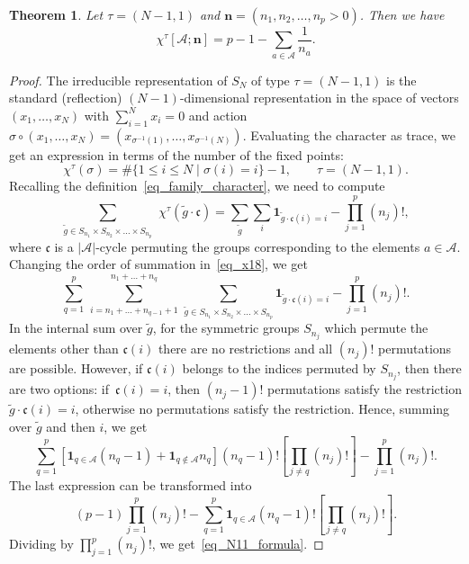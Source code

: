 \documentclass[11pt]{article}
\newtheorem{theorem}[theo]{Theorem}
\theoremstyle{definition}
\numberwithin{equation}{section}
\begin{document}
\begin{theorem}
 \label{Theorem_character_sum_fundamental} Let $\tau=(N-1,1)$ and  $\mathbf n=(n_1, n_2, \dots, n_p>0)$. Then we have
\begin{equation} \label{eq_N11_formula}
 \chi^{\tau}[\mathcal A; \mathbf n]=p-1-\sum_{a\in \mathcal A} \frac{1}{n_a}.
\end{equation}
\end{theorem}
\begin{proof} The irreducible representation of $S_N$ of type $\tau=(N-1,1)$ is the standard (reflection) $(N-1)$-dimensional representation in the space of vectors $(x_1,\dots,x_N)$ with $\sum_{i=1}^N x_i=0$ and action $\sigma\circ (x_1,\dots,x_N)=(x_{\sigma^{-1}(1)},\dots,x_{\sigma^{-1}(N)})$. Evaluating the character as trace, we get an expression in terms of the number of the fixed points:
$$
  \chi^{\tau}(\sigma)=\#\{1\le i \le N\mid \sigma(i)=i\}-1, \qquad \tau=(N-1,1).
$$
Recalling the definition~\eqref{eq_family_character}, we need to compute
\begin{equation}
\label{eq_x18}
\sum_{\tilde g\in S_{n_1}\times S_{n_2}\times  \dots \times S_{n_p}}\,\, \chi^\tau(\tilde g \cdot \mathfrak c)
=\sum_{\tilde g} \sum_i \mathbf 1_{ \tilde g \cdot \mathfrak c (i)=i}  - \prod_{j=1}^p (n_j)!,
\end{equation}
where $\mathfrak c$ is a $|\mathcal A|$-cycle permuting the groups corresponding to the elements $a\in\mathcal A$. Changing the order of summation in~\eqref{eq_x18}, we get
$$
 \sum_{q=1}^p\, \sum_{i=n_1+\dots+n_{q-1}+1}^{n_1+\dots+n_q} \, \sum_{\tilde g\in S_{n_1}\times S_{n_2}\times  \dots \times S_{n_p}} \mathbf 1_{ \tilde g \cdot \mathfrak c (i)=i}  - \prod_{j=1}^p (n_j)!.
$$
In the internal sum over $\tilde g$, for the symmetric groups $S_{n_j}$ which permute the elements other than $ \mathfrak c (i)$ there are no restrictions and all $(n_j)!$ permutations are possible. However, if $\mathfrak c(i)$ belongs to the indices permuted by $S_{n_j}$, then there are two options: if~$\mathfrak c(i)=i$, then $(n_j-1)!$ permutations satisfy the restriction $ \tilde g \cdot \mathfrak c (i)=i$, otherwise no permutations satisfy the restriction. Hence, summing over $\tilde g$ and then $i$, we get
$$\sum_{q=1}^p \left[\mathbf 1_{q\in \mathcal A} (n_q-1)+\mathbf 1_{q\not\in\mathcal A} n_q \right] (n_q-1)! \left[\prod_{j\ne q} (n_j)!\right]
 - \prod_{j=1}^p (n_j)!.
$$
The last expression can be transformed into
$$
(p-1)\prod_{j=1}^p (n_j)! - \sum_{q=1}^p \mathbf 1_{q\in \mathcal A} (n_q-1)! \left[\prod_{j\ne q} (n_j)!\right].
$$
Dividing by $\prod\limits_{j=1}^p (n_j)!$, we get~\eqref{eq_N11_formula}.
\end{proof}
\end{document}
